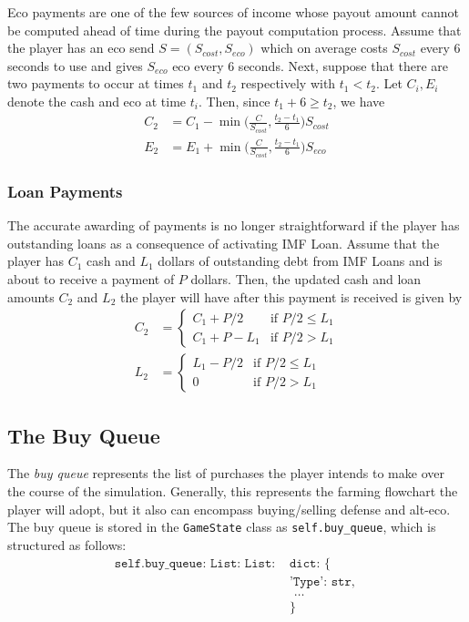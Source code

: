 \documentclass[12pt,letterpaper]{article}
\theoremstyle{remark}
\theoremstyle{plain}
\begin{document}
Eco payments are one of the few sources of income whose payout amount cannot be computed ahead of time during the payout computation process. Assume that the player has an eco send $S = (S_{cost}, S_{eco})$ which on average costs $S_{cost}$ every 6 seconds to use and gives $S_{eco}$ eco every $6$ seconds. Next, suppose that there are two payments to occur at times $t_1$ and $t_2$ respectively with $t_1 < t_2$. Let $C_i,E_i$ denote the cash and eco at time $t_i$. Then, since $t_1 + 6 \geq t_2$, we have
\begin{align}
    C_2 &= C_1 - \min\Big(\frac{C}{S_{cost}}, \frac{t_2-t_1}{6}\Big)S_{cost} \\
    E_2 &= E_1 + \min\Big(\frac{C}{S_{cost}}, \frac{t_2-t_1}{6}\Big)S_{eco}
\end{align}

\subsubsection{Loan Payments}

The accurate awarding of payments is no longer straightforward if the player has outstanding loans as a consequence of activating IMF Loan. Assume that the player has $C_1$ cash and $L_1$ dollars of outstanding debt from IMF Loans and is about to receive a payment of $P$ dollars. Then, the updated cash and loan amounts $C_2$ and $L_2$ the player will have after this payment is received is given by
\begin{align}\label{loan payment formula}
    C_2 &= \begin{cases}
    C_1 + P/2 & \text{if } P/2 \leq L_1 \\
    C_1 + P - L_1 & \text{if } P/2 > L_1
    \end{cases} \\
    L_2 &= \begin{cases}
    L_1 - P/2 & \text{if } P/2 \leq L_1 \\
    0 & \text{if } P/2 > L_1
    \end{cases}
\end{align}

\subsection{The Buy Queue}

The \textit{buy queue} represents the list of purchases the player intends to make over the course of the simulation. Generally, this represents the farming flowchart the player will adopt, but it also can encompass buying/selling defense and alt-eco. The buy queue is stored in the \texttt{GameState} class as \texttt{self.buy\_queue}, which is structured as follows:
\begin{align*}
\texttt{self.buy\_queue: List: List: } & \texttt{dict: \{ }\\
& \texttt{'Type': str, } \\
& \texttt{ \ldots } \\
& \texttt{\}}
\end{align*}
\end{document}
